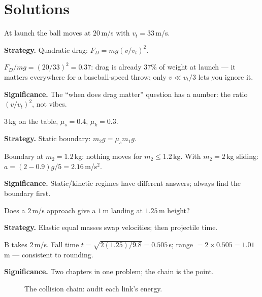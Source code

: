 \section{Solutions}\label{sec:ws-sol}

\begin{example}\label{ex:w1}
At launch the ball moves at $20$\,m/s with $v_t=33$\,m/s.
\par\smallskip
\textbf{Strategy.} Quadratic drag: $F_D=mg(v/v_t)^{2}$.
\begin{solution}
$F_D/mg=(20/33)^{2}=0.37$: drag is already $37\%$ of weight at launch
--- it matters everywhere for a baseball-speed throw; only
$v\ll v_t/3$ lets you ignore it. \checkmark
\end{solution}
\textbf{Significance.} The ``when does drag matter'' question has a
number: the ratio $(v/v_t)^{2}$, not vibes.
\end{example}

\begin{example}\label{ex:w2}
$3$\,kg on the table, $\mu_s=0.4$, $\mu_k=0.3$.
\par\smallskip
\textbf{Strategy.} Static boundary: $m_2g=\mu_sm_1g$.
\begin{solution}
Boundary at $m_2=1.2$\,kg: nothing moves for $m_2\le1.2$\,kg.
With $m_2=2$\,kg sliding:
$a=(2-0.9)g/5=2.16$\,m/s$^{2}$. \checkmark
\end{solution}
\textbf{Significance.} Static/kinetic regimes have different answers;
always find the boundary first.
\end{example}

\begin{example}\label{ex:w3}
Does a $2$\,m/s approach give a $1$\,m landing at $1.25$\,m height?
\par\smallskip
\textbf{Strategy.} Elastic equal masses swap velocities; then
projectile time.
\begin{solution}
B takes $2$\,m/s. Fall time $t=\sqrt{2(1.25)/9.8}=0.505$\,s;
range $=2\times0.505=1.01$\,m --- consistent to rounding. \checkmark
\end{solution}
\textbf{Significance.} Two chapters in one problem; the chain is the
point.
\end{example}

\begin{figure}[htbp]\centering

\caption{The collision chain: audit each link's energy.}
\label{fig:chain}
\end{figure}

